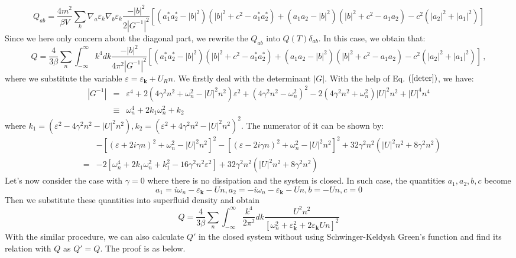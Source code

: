 \documentclass{article}
\newcommand{\tmmathbf}[1]{\ensuremath{\boldsymbol{#1}}}
\begin{document}
\begin{equation}
  Q_{a b} = \frac{4 m^2}{\beta V} \sum_k \nabla_a \varepsilon_k \nabla_b
  \varepsilon_k \frac{- | b |^2}{2 | G^{- 1} |^2} \left[ (a_1^{\ast}
  a_2^{\ast} - | b |^2) (| b |^2 + c^2 - a_1^{\ast} a_2^{\ast}) + \left( a_1
  a_2 - | b |^2 \right) (| b |^2 + c^2 - a_1 a_2) - c^2 (| a_2 |^2 + | a_1
  |^2) \right]
\end{equation}
Since we here only concern about the diagonal part, we rewrite the $Q_{a b}$
into $Q (T) \delta_{a b}$. In this case, we obtain that:
\begin{equation}
  Q = \frac{4}{3 \beta} \sum_n \int_{- \infty}^{\infty} k^4 d k \frac{- | b
  |^2}{4 \pi^2 | G^{- 1} |^2} \left[ (a_1^{\ast} a_2^{\ast} - | b |^2) (| b
  |^2 + c^2 - a_1^{\ast} a_2^{\ast}) + \left( a_1 a_2 - | b |^2 \right) (| b
  |^2 + c^2 - a_1 a_2) - c^2 (| a_2 |^2 + | a_1 |^2) \right] \,,
  \label{Qboson}
\end{equation}
where we substitute the variable $\varepsilon = \varepsilon_{\tmmathbf{k}} +
U_R n$. We firstly deal with the determinant $| G |$. With the help of Eq.
$\left(  \ref{deter} \right)$, we have:
\begin{eqnarray}
  | G^{- 1} | & = & \varepsilon^4 + 2 (4 \gamma^2 n^2 + \omega_n^2 - | U |^2
  n^2) \varepsilon^2 + (4 \gamma^2 n^2 - \omega_n^2)^2 - 2 (4 \gamma^2 n^2 +
  \omega_n^2) | U |^2 n^2 + | U |^4 n^4 \nonumber\\
  & \equiv & \omega_n^4 + 2 k_1 \omega_n^2 + k_2 
\end{eqnarray}
where $k_1 = (\varepsilon^2 - 4 \gamma^2 n^2 - | U |^2 n^2), k_2 =
(\varepsilon^2 + 4 \gamma^2 n^2 - | U |^2 n^2)^2$. The numerator of it can be
shown by:
\begin{eqnarray}
  &  & - [(\varepsilon + 2 i \gamma n)^2 + \omega_n^2 - | U |^2 n^2]^2 -
  [(\varepsilon - 2 i \gamma n)^2 + \omega_n^2 - | U |^2 n^2]^2 + 32 \gamma^2
  n^2 (| U |^2 n^2 + 8 \gamma^2 n^2) \nonumber\\
  & = & - 2 [\omega_n^4 + 2 k_1 \omega_n^2 + k_1^2 - 16 \gamma^2 n^2
  \varepsilon^2] + 32 \gamma^2 n^2 (| U |^2 n^2 + 8 \gamma^2 n^2) 
\end{eqnarray}
Let's now consider the case with $\gamma = 0$ where there is no dissipation
and the system is closed. In such case, the quantities $a_1, a_2, b, c$ become
\begin{equation}
  a_1 = i \omega_n - \varepsilon_{\tmmathbf{k}} - U n, a_2 = - i \omega_n -
  \varepsilon_{\tmmathbf{k}} - U n, b = - U n, c = 0
\end{equation}
Then we substitute these quantities into superfluid density and obtain
\begin{equation}
  Q = \frac{4}{3 \beta} \sum_n \int_{- \infty}^{\infty} \frac{k^4}{2 \pi^2} d
  k \frac{U^2 n^2}{[\omega_n^2 + \varepsilon_{\tmmathbf{k}}^2 + 2
  \varepsilon_{\tmmathbf{k}} U n]^2} \label{Qzero}
\end{equation}
With the similar procedure, we can also calculate $Q'$ in the closed system
without using Schwinger-Keldysh Green's function and find its relation with
$Q$ as $Q' = Q$. The proof is as below.
\end{document}

